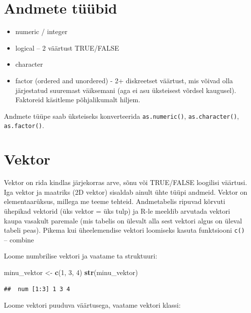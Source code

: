 \documentclass[]{book}
\newenvironment{Shaded}{\begin{snugshade}}{\end{snugshade}}
\newcommand{\KeywordTok}[1]{\textcolor[rgb]{0.13,0.29,0.53}{\textbf{#1}}}
\newcommand{\DecValTok}[1]{\textcolor[rgb]{0.00,0.00,0.81}{#1}}
\newcommand{\StringTok}[1]{\textcolor[rgb]{0.31,0.60,0.02}{#1}}
\newcommand{\NormalTok}[1]{#1}
\providecommand{\tightlist}{%
  \setlength{\itemsep}{0pt}\setlength{\parskip}{0pt}}
\begin{document}
\section{Andmete tüübid}\label{andmete-tuubid}

\begin{itemize}
\tightlist
\item
  numeric / integer
\item
  logical -- 2 väärtust TRUE/FALSE
\item
  character
\item
  factor (ordered and unordered) - 2+ diskreetset väärtust, mis võivad
  olla järjestatud suuremast väiksemani (aga ei asu üksteisest võrdsel
  kaugusel). Faktoreid käsitleme põhjalikumalt hiljem.
\end{itemize}

Andmete tüüpe saab üksteiseks konverteerida \texttt{as.numeric()},
\texttt{as.character()}, \texttt{as.factor()}.

\section{Vektor}\label{vektor}

Vektor on rida kindlas järjekorras arve, sõnu või TRUE/FALSE loogilisi
väärtusi. Iga vektor ja maatriks (2D vektor) sisaldab ainult ühte tüüpi
andmeid. Vektor on elementaarüksus, millega me teeme tehteid.
Andmetabelis ripuvad kõrvuti ühepikad vektorid (üks vektor = üks tulp)
ja R-le meeldib arvutada vektori kaupa vasakult paremale (mis tabelis on
ülevalt alla sest vektori algus on üleval tabeli peas). Pikema kui
üheelemendise vektori loomiseks kasuta funktsiooni \texttt{c()} --
combine

Loome numbrilise vektori ja vaatame ta struktuuri:

\begin{Shaded}
\begin{Highlighting}[]
\NormalTok{minu_vektor <-}\StringTok{ }\KeywordTok{c}\NormalTok{(}\DecValTok{1}\NormalTok{, }\DecValTok{3}\NormalTok{, }\DecValTok{4}\NormalTok{)}
\KeywordTok{str}\NormalTok{(minu_vektor)}
\end{Highlighting}
\end{Shaded}

\begin{verbatim}
##  num [1:3] 1 3 4
\end{verbatim}

Loome vektori puuduva väärtusega, vaatame vektori klassi:
\end{document}
